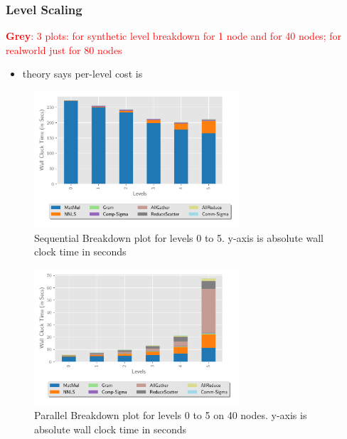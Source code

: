 \documentclass[conference,compsoc]{IEEEtran}
\newcommand{\GB}[1]{\textcolor{red}{\textbf{Grey}: #1}}
\begin{document}
\subsubsection{Level Scaling}

\GB{3 plots: for synthetic level breakdown for 1 node and for 40 nodes; for realworld just for 80 nodes}

\begin{itemize}
	\item theory says per-level cost is 
\end{itemize}

\begin{figure}
\begin{center}
\includegraphics[height=2in, width=\columnwidth]{plots/synthetic_sequential_level_breakdown.pdf}
\caption{Sequential Breakdown plot for levels 0 to 5. y-axis is absolute wall clock time in seconds}
\label{fig:seqlevelbreakdown}
\end{center}
\end{figure}

\begin{figure}
\begin{center}
\includegraphics[height=2in, width=\columnwidth]{plots/synthetic_parallel_level_breakdown.pdf}
\caption{Parallel Breakdown plot for levels 0 to 5 on 40 nodes. y-axis is absolute wall clock time in seconds}
\label{fig:parallellevelbreakdown}
\end{center}
\end{figure}
\end{document}
